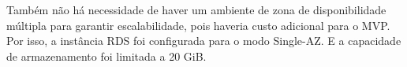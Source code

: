 
Também não há necessidade de haver um ambiente de zona de disponibilidade múltipla para garantir escalabilidade, pois haveria custo adicional para o MVP. Por isso, a instância RDS foi configurada para o modo Single-AZ. E a capacidade de armazenamento foi limitada a 20 GiB.




